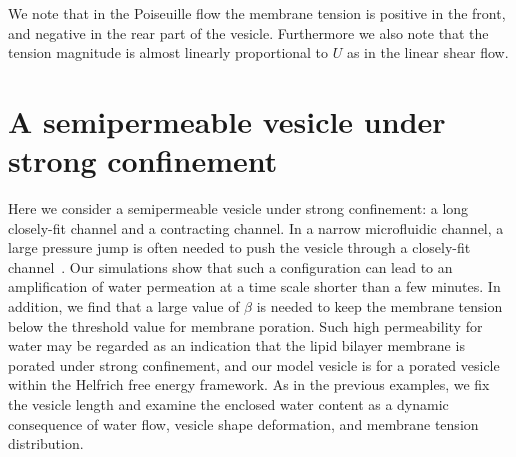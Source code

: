 \documentclass[prb,preprint,showpacs,preprintnumbers,amsmath,amssymb,longbibliography]{revtex4-1}
\begin{document}
We note that in the Poiseuille flow the membrane tension is positive in
the front, and negative in the rear part of the vesicle. Furthermore we
also note that the tension magnitude is almost linearly proportional to
$U$ as in the linear shear flow.


\section{A semipermeable vesicle under strong confinement}
Here we consider a semipermeable vesicle under strong confinement: a
long closely-fit channel and a contracting channel. In a narrow
microfluidic channel, a large pressure jump is often needed to push the
vesicle through a closely-fit channel~\cite{abk-fai-sto2006}.  Our
simulations show that such a configuration can lead to an amplification
of water permeation at a time scale shorter than a few minutes. In
addition, we find that a large value of $\beta$ is needed to keep the
membrane tension below the threshold value for membrane poration. Such
high permeability for water may be regarded as an indication that the
lipid bilayer membrane is porated under strong confinement, and our
model vesicle is for a porated vesicle within the Helfrich free energy
framework.  As in the previous examples, we fix the vesicle length and
examine the enclosed water content as a dynamic consequence of water
flow, vesicle shape deformation, and membrane tension distribution.


\end{document}
